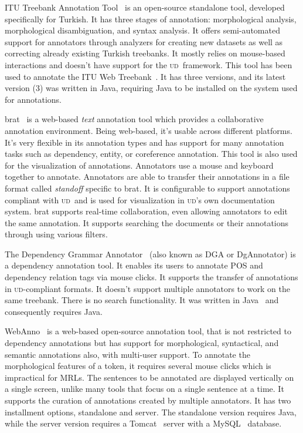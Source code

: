 \documentclass{elektr}
\newcommand{\ud}{\textsc{ud}}
\begin{document}
ITU Treebank Annotation Tool~\cite{itu-annotation-tool} is an open-source standalone tool, developed specifically for Turkish.
It has three stages of annotation: morphological analysis, morphological disambiguation, and syntax analysis.
It offers semi-automated support for annotators through analyzers for creating new datasets as well as correcting already existing Turkish treebanks.
It mostly relies on mouse-based interactions and doesn't have support for the \ud\ framework.
This tool has been used to annotate the ITU Web Treebank~\cite{itu-annotation-tool}. %
It has three versions, and its latest version (3) was written in Java, requiring Java to be installed on the system used for annotations.

brat~\cite{brat} is a web-based \textit{text} annotation tool which provides a collaborative annotation environment.
Being web-based, it's usable across different platforms.
It's very flexible in its annotation types and has support for many annotation tasks such as dependency, entity, or coreference annotation.
This tool is also used for the visualization of annotations.
Annotators use a mouse and keyboard together to annotate.
Annotators are able to transfer their annotations in a file format called \textit{standoff} specific to brat.
It is configurable to support annotations compliant with \ud\ and is used for visualization in \ud's own documentation system.
brat supports real-time collaboration, even allowing annotators to edit the same annotation.
It supports searching the documents or their annotations through using various filters.

The Dependency Grammar Annotator~\cite{dgannotator} (also known as DGA or DgAnnotator) is a dependency annotation tool.
It enables its users to annotate POS and dependency relation tags via mouse clicks.
It supports the transfer of annotations in \ud-compliant formats.
It doesn't support multiple annotators to work on the same treebank.
There is no search functionality.
It was written in Java~\cite{java} and consequently requires Java.

WebAnno~\cite{webanno} is a web-based open-source annotation tool, that is not restricted to dependency annotations but has support for morphological, syntactical, and semantic annotations also, with multi-user support.
To annotate the morphological features of a token, it requires several mouse clicks which is impractical for MRLs.
The sentences to be annotated are displayed vertically on a single screen, unlike many tools that focus on a single sentence at a time.
It supports the curation of annotations created by multiple annotators.
It has two installment options, standalone and server.
The standalone version requires Java, while the server version requires a Tomcat~\cite{tomcat} server with a MySQL~\cite{mysql} database.
\end{document}
